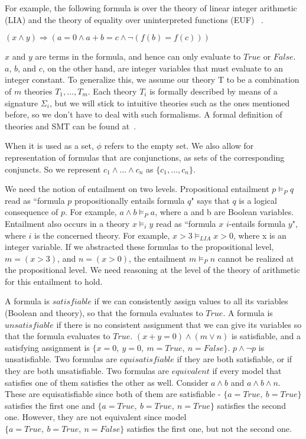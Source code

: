 \documentclass{article}
\begin{document}
For example, the following formula is over 
the theory of linear integer 
arithmetic (LIA) and the theory of 
equality over uninterpreted functions (EUF)
~\cite{LIAEUF}.
\begin{center}
$(x \land y) \Rightarrow (a = 0 \land a + b = c \land 
\neg (f(b) = f(c)))$ 
\end{center}
$x$ and $y$ are terms in the 
formula, and hence can only evaluate to $True$ or $False$.
$a$, $b$, and $c$, on the other hand, are integer variables 
that must evaluate to an integer constant. To generalize 
this, we assume our theory T to be a combination of $m$ 
theories $T_1, ..., T_m$. Each theory $T_i$ is formally 
described by means of a signature $\Sigma_i$, but we 
will stick to intuitive theories such as the ones mentioned 
before, so we don't have to deal with such formalisms. A 
formal definition of theories and SMT can be found 
at~\cite{DBLP:reference/mc/BarrettT18}.

When it is used as a set, $\phi$ refers to the empty set. 
We also allow for representation of formulas that are 
conjunctions, as sets of the corresponding 
conjuncts. So we represent $c_1 \land ... \land c_n$ as
$\{c_1, ..., c_n\}$.

We need the notion of entailment on two levels. Propositional 
entailment $p \models_P q$ read as 
``formula $p$ propositionally entails formula $q$" says 
that $q$ is a logical consequence of $p$. For example, 
$a \land b \models_P a$, where a and b are Boolean 
variables. Entailment also occurs in a theory
$x \models_i y$ read as ``formula $x$ $i$-entails formula $y$", 
where $i$ is the concerned theory. For example, 
$x > 3 \models_{LIA} x > 0$, where x is an integer variable.
If we abstracted these formulas to the propositional level, 
$m = (x > 3)$, and $n = (x > 0)$, 
the entailment $m \models_P n$ cannot be realized at the 
propositional level. We need reasoning at the level of 
the theory of arithmetic for this entailment to hold.

A formula is $satisfiable$ if we can consistently assign
values to all its variables (Boolean and theory), 
so that the formula evaluates to $True$. A formula is 
$unsatisfiable$ if there is no consistent assignment that 
we can give its variables so that the formula evaluates to 
$True$. $(x + y = 0) \land (m \lor n)$ is satisfiable, 
and a satisfying assignment is $\{x = 0,\ y = 0,\ m = True,\ 
n = False\}$. $p \land \neg p$ is unsatisfiable. Two formulas 
are $equisatisfiable$ if they are both satisfiable, or if they 
are both unsatisfiable. Two formulas are $equivalent$ 
if every model that satisfies 
one of them satisfies the other as well. Consider 
$a \land b$ and $a \land b \land n$. These are 
equisatisfiable since both of them are satisfiable - 
$\{a = True,\ b = True\}$ satisfies the first one and 
$\{a = True,\ b = True,\ n = True\}$ satisfies the second one.
However, they are not equivalent since model 
$\{a = True,\ b = True,\ n = False\}$ satisfies the first one, 
but not the second one.
\end{document}
